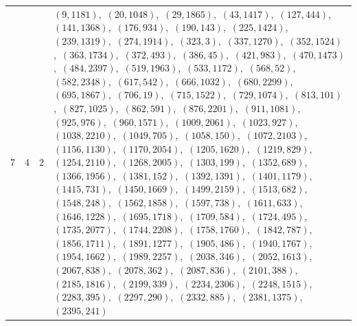\documentclass[11pt]{article}
\begin{document}
\begin{longtable}{@{}rrl>{\raggedright\arraybackslash}p{}@{}}
7 & 4 & $2$ & $(9,1181)$,\allowbreak\ $(20,1048)$,\allowbreak\ $(29,1865)$,\allowbreak\ $(43,1417)$,\allowbreak\ $(127,444)$,\allowbreak\ $(141,1368)$,\allowbreak\ $(176,934)$,\allowbreak\ $(190,143)$,\allowbreak\ $(225,1424)$,\allowbreak\ $(239,1319)$,\allowbreak\ $(274,1914)$,\allowbreak\ $(323,3)$,\allowbreak\ $(337,1270)$,\allowbreak\ $(352,1524)$,\allowbreak\ $(363,1734)$,\allowbreak\ $(372,493)$,\allowbreak\ $(386,45)$,\allowbreak\ $(421,983)$,\allowbreak\ $(470,1473)$,\allowbreak\ $(484,2397)$,\allowbreak\ $(519,1963)$,\allowbreak\ $(533,1172)$,\allowbreak\ $(568,52)$,\allowbreak\ $(582,2348)$,\allowbreak\ $(617,542)$,\allowbreak\ $(666,1032)$,\allowbreak\ $(680,2299)$,\allowbreak\ $(695,1867)$,\allowbreak\ $(706,19)$,\allowbreak\ $(715,1522)$,\allowbreak\ $(729,1074)$,\allowbreak\ $(813,101)$,\allowbreak\ $(827,1025)$,\allowbreak\ $(862,591)$,\allowbreak\ $(876,2201)$,\allowbreak\ $(911,1081)$,\allowbreak\ $(925,976)$,\allowbreak\ $(960,1571)$,\allowbreak\ $(1009,2061)$,\allowbreak\ $(1023,927)$,\allowbreak\ $(1038,2210)$,\allowbreak\ $(1049,705)$,\allowbreak\ $(1058,150)$,\allowbreak\ $(1072,2103)$,\allowbreak\ $(1156,1130)$,\allowbreak\ $(1170,2054)$,\allowbreak\ $(1205,1620)$,\allowbreak\ $(1219,829)$,\allowbreak\ $(1254,2110)$,\allowbreak\ $(1268,2005)$,\allowbreak\ $(1303,199)$,\allowbreak\ $(1352,689)$,\allowbreak\ $(1366,1956)$,\allowbreak\ $(1381,152)$,\allowbreak\ $(1392,1391)$,\allowbreak\ $(1401,1179)$,\allowbreak\ $(1415,731)$,\allowbreak\ $(1450,1669)$,\allowbreak\ $(1499,2159)$,\allowbreak\ $(1513,682)$,\allowbreak\ $(1548,248)$,\allowbreak\ $(1562,1858)$,\allowbreak\ $(1597,738)$,\allowbreak\ $(1611,633)$,\allowbreak\ $(1646,1228)$,\allowbreak\ $(1695,1718)$,\allowbreak\ $(1709,584)$,\allowbreak\ $(1724,495)$,\allowbreak\ $(1735,2077)$,\allowbreak\ $(1744,2208)$,\allowbreak\ $(1758,1760)$,\allowbreak\ $(1842,787)$,\allowbreak\ $(1856,1711)$,\allowbreak\ $(1891,1277)$,\allowbreak\ $(1905,486)$,\allowbreak\ $(1940,1767)$,\allowbreak\ $(1954,1662)$,\allowbreak\ $(1989,2257)$,\allowbreak\ $(2038,346)$,\allowbreak\ $(2052,1613)$,\allowbreak\ $(2067,838)$,\allowbreak\ $(2078,362)$,\allowbreak\ $(2087,836)$,\allowbreak\ $(2101,388)$,\allowbreak\ $(2185,1816)$,\allowbreak\ $(2199,339)$,\allowbreak\ $(2234,2306)$,\allowbreak\ $(2248,1515)$,\allowbreak\ $(2283,395)$,\allowbreak\ $(2297,290)$,\allowbreak\ $(2332,885)$,\allowbreak\ $(2381,1375)$,\allowbreak\ $(2395,241)$\\

\end{longtable}
\end{document}
